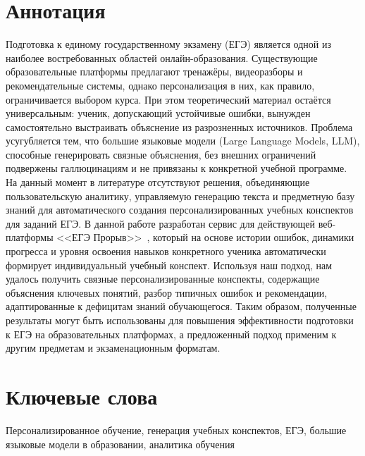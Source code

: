 \documentclass[a4paper,12pt]{extarticle}
\begin{document}
\newpage
\setcounter{page}{2}

{
	\hypersetup{linkcolor=black}
	\tableofcontents
}

\newpage
\section*{Аннотация}

Подготовка к единому государственному экзамену (ЕГЭ) является одной
из наиболее востребованных областей онлайн-образования. Существующие образовательные
платформы предлагают тренажёры, видеоразборы и рекомендательные системы, однако
персонализация в них, как правило, ограничивается выбором курса. При этом 
теоретический материал остаётся универсальным: ученик, допускающий устойчивые ошибки, 
вынужден самостоятельно выстраивать объяснение из разрозненных источников. Проблема 
усугубляется тем, что большие языковые модели (Large Language Models, LLM), способные 
генерировать связные объяснения, без внешних ограничений подвержены
галлюцинациям и не привязаны к конкретной учебной программе. На данный момент
в литературе отсутствуют решения, объединяющие пользовательскую аналитику,
управляемую генерацию текста и предметную базу знаний для автоматического создания
персонализированных учебных конспектов для заданий ЕГЭ. В данной работе разработан
сервис для действующей веб-платформы <<ЕГЭ Прорыв>>~\cite{exambreakout2026}, 
который на основе истории ошибок, динамики прогресса и уровня освоения навыков 
конкретного ученика автоматически формирует индивидуальный учебный конспект. 
Используя наш подход, нам удалось получить связные персонализированные конспекты, содержащие
объяснения ключевых понятий, разбор типичных ошибок и рекомендации, адаптированные
к дефицитам знаний обучающегося. Таким образом, полученные результаты могут быть
использованы для повышения эффективности подготовки к ЕГЭ на образовательных
платформах, а предложенный подход применим к другим предметам и экзаменационным
форматам.


\section*{Ключевые слова}
Персонализированное обучение, генерация учебных конспектов, ЕГЭ, 
большие языковые модели в образовании, аналитика обучения
\pagebreak
\end{document}
